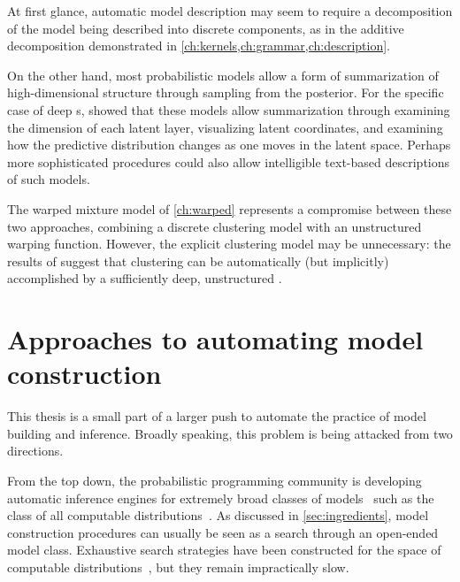 \begin{itemize}
At first glance, automatic model description may seem to require a decomposition of the model being described into discrete components, as in the additive decomposition demonstrated in \cref{ch:kernels,ch:grammar,ch:description}.

On the other hand, most probabilistic models allow a form of summarization of high-dimensional structure through sampling from the posterior.
For the specific case of deep \gp{}s, \citet{damianou2012deep} showed that these models allow summarization through examining the dimension of each latent layer, visualizing latent coordinates, and examining how the predictive distribution changes as one moves in the latent space.
Perhaps more sophisticated procedures could also allow intelligible text-based descriptions of such models.

\end{itemize}

The warped mixture model of \cref{ch:warped} represents a compromise between these two approaches, combining a discrete clustering model with an unstructured warping function.
However, the explicit clustering model may be unnecessary: the results of \citet{damianou2012deep} suggest that clustering can be automatically (but implicitly) accomplished by a sufficiently deep, unstructured \gp{}.




\section{Approaches to automating model construction}
\label{top-down-vs-bottom-up}


This thesis is a small part of a larger push to automate the practice of model building and inference.
Broadly speaking, this problem is being attacked from two directions.

From the top down, the probabilistic programming community is developing automatic inference engines for extremely broad classes of models~\citep{goodman2008church,mansinghka2014venture,Wood-AISTATS-2014,koller1997effective,milch20071,stan-software:2014} such as the class of all computable distributions~\citep{solomonoff1964formal, li2009introduction}.
As discussed in \cref{sec:ingredients}, model construction procedures can usually be seen as a search through an open-ended model class.
Exhaustive search strategies have been constructed for the space of computable distributions~\citep{hutter2002fastest,schmidhuber2002speed,levin1973universal}, but they remain impractically slow.


